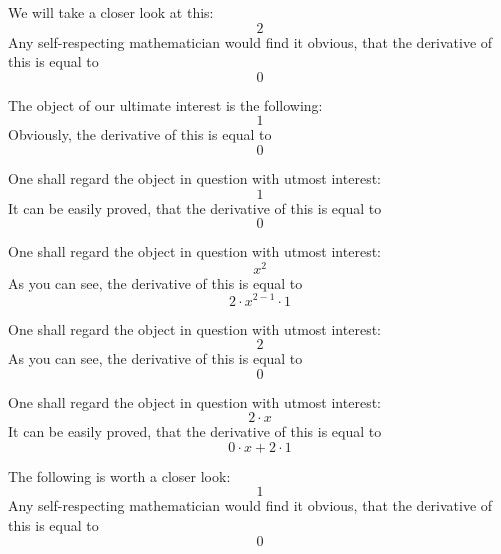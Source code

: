 \documentclass{article}
\begin{document}
We will take a closer look at this:
\begin{equation}
2 
\end{equation}
Any self-respecting mathematician would find it obvious, that the derivative of this is equal to
\begin{equation}
0 
\end{equation}

The object of our ultimate interest is the following:
\begin{equation}
1 
\end{equation}
Obviously, the derivative of this is equal to
\begin{equation}
0 
\end{equation}

One shall regard the object in question with utmost interest:
\begin{equation}
1 
\end{equation}
It can be easily proved, that the derivative of this is equal to
\begin{equation}
0 
\end{equation}

One shall regard the object in question with utmost interest:
\begin{equation}
x ^{2 } 
\end{equation}
As you can see, the derivative of this is equal to
\begin{equation}
2 \cdot x ^{2 - 1 } \cdot 1 
\end{equation}

One shall regard the object in question with utmost interest:
\begin{equation}
2 
\end{equation}
As you can see, the derivative of this is equal to
\begin{equation}
0 
\end{equation}

One shall regard the object in question with utmost interest:
\begin{equation}
2 \cdot x 
\end{equation}
It can be easily proved, that the derivative of this is equal to
\begin{equation}
0 \cdot x + 2 \cdot 1 
\end{equation}

The following is worth a closer look:
\begin{equation}
1 
\end{equation}
Any self-respecting mathematician would find it obvious, that the derivative of this is equal to
\begin{equation}
0 
\end{equation}
\end{document}
